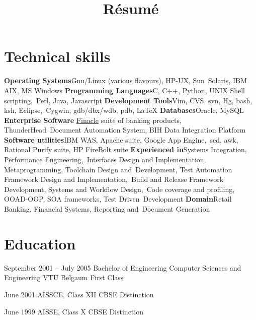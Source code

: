 \documentclass[11pt,a4paper,sans]{moderncv}
\title{Résumé}
\begin{document}
\maketitle

\newcommand\colorhref[3][linky]{\href{#2}{\small\color{#1}#3}}

\section{Technical skills}
\cvcomputer
{\textbf{Operating Systems}}{Gnu/Linux (various flavours), HP-UX, Sun\
	Solaris, IBM AIX, MS Windows}
{\textbf{Programming Languages}}{C, C++, Python, UNIX Shell scripting,\
	Perl, Java, Javascript}
\cvcomputer
{\textbf{Development Tools}}{Vim, CVS, svn, Hg, bash, ksh, Eclipse,\
Cygwin, gdb/dbx/wdb, pdb, \textrm{\LaTeX}}
{\textbf{Databases}}{Oracle, MySQL}
\cvcomputer
{\textbf{Enterprise Software}}{
	\hypersetup{linkcolor=blue}
	\colorhref{finacle.com}{Finacle} suite of banking products, ThunderHead\
Document Automation System, BIH Data Integration Platform}
{\textbf{Software utilities}}{IBM WAS, Apache suite, Google App Engine,\
sed, awk, Rational Purify suite, HP FireBolt suite}
\cvcomputer
{\textbf{Experienced in}}{Systems Integration, Performance Engineering,\
	Interfaces Design and Implementation, Metaprogramming, Toolchain Design and\
	Development, Test Automation Framework Design and Implementation,\
	Build and Release Framework Development, Systems and Workflow Design,\
	Code coverage and profiling, OOAD-OOP, SOA frameworks, Test Driven\
	Development}
{\textbf{Domain}}{Retail Banking, Financial Systems, Reporting and\
Document Generation}
{}{}

\section{Education}

\cventry
{September 2001 -- July 2005}
{Bachelor of Engineering}
{Computer Sciences and Engineering}
{VTU Belgaum}
{First Class}
{} 

\cventry
{June 2001}
{AISSCE, Class XII}
{CBSE}
{Distinction}
{}
{} 

\cventry
{June 1999}
{AISSE, Class X}
{CBSE}
{Distinction}
{} 
{}

\end{document}
